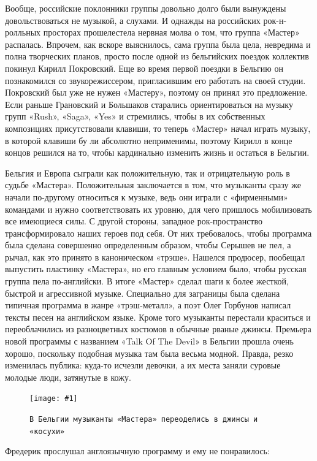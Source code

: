 \documentclass[10pt, twoside]{book}
\newcommand{\myincludegraphics}[1]{\texttt{[image: \#1]}}
\begin{document}
Вообще, российские поклонники группы довольно долго были вынуждены довольствоваться не музыкой, а слухами. И однажды на
российских рок-н-ролльных просторах прошелестела нервная молва о том, что группа «Мастер» распалась. Впрочем, как вскоре
выяснилось, сама группа была цела, невредима и полна творческих планов, просто после одной из бельгийских поездок
коллектив покинул Кирилл Покровский. Еще во время первой поездки в Бельгию он познакомился со звукорежиссером,
пригласившим его работать на своей студии. Покровский был уже не нужен «Мастеру», поэтому он принял это предложение.
Если раньше Грановский и Большаков старались ориентироваться на музыку групп «Rush», «Saga», «Yes» и стремились, чтобы в
их собственных композициях присутствовали клавиши, то теперь «Мастер» начал играть музыку, в которой клавиши бу ли
абсолютно неприменимы, поэтому Кирилл в конце концов решился на то, чтобы кардинально изменить жизнь и остаться в
Бельгии.

Бельгия и Европа сыграли как положительную, так и отрицательную роль в судьбе «Мастера». Положительная заключается в
том, что музыканты сразу же начали по-другому относиться к музыке, ведь они играли с «фирменными» командами и нужно
соответствовать их уровню, для чего пришлось мобилизовать все имеющиеся силы. С другой стороны, западное
рок-пространство трансформировало наших героев под себя. От них требовалось, чтобы программа была сделана совершенно
определенным образом, чтобы Серышев не пел, а рычал, как это принято в каноническом «трэше». Нашелся продюсер, пообещал
выпустить пластинку «Мастера», но его главным условием было, чтобы русская группа пела по-английски. В итоге «Мастер»
сделал шаги к более жесткой, быстрой и агрессивной музыке. Специально для заграницы была сделана типичная программа в
жанре «трэш-металл», а поэт Олег Горбунов написал тексты песен на английском языке. Кроме того музыканты перестали
краситься и переоблачились из разноцветных костюмов в обычные рваные джинсы. Премьера новой программы с названием «Talk
Of The Devil» в Бельгии прошла очень хорошо, поскольку подобная музыка там была весьма модной. Правда, резко изменилась
публика: куда-то исчезли девочки, а их места заняли суровые молодые люди, затянутые в кожу.

\begin{figure}[h]
    \centering
    \myincludegraphics{Image26}
    \caption{\texttt{В Бельгии музыканты «Мастера» переоделись в джинсы и «косухи»}}
\end{figure}

Фредерик прослушал англоязычную программу и ему не понравилось:
\end{document}
